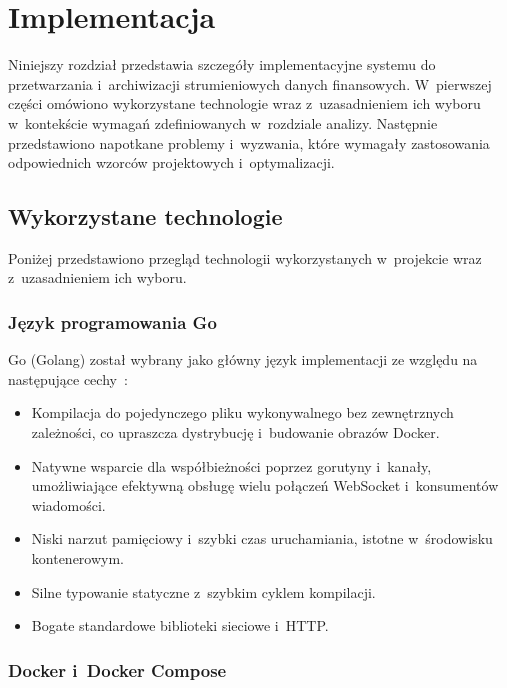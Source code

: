 \chapter{Implementacja}
\label{ch:implementacja}

Niniejszy rozdział przedstawia szczegóły implementacyjne systemu do przetwarzania i~archiwizacji strumieniowych danych
finansowych.
W~pierwszej części omówiono wykorzystane technologie wraz z~uzasadnieniem ich wyboru w~kontekście wymagań
zdefiniowanych w~rozdziale analizy.
Następnie przedstawiono napotkane problemy i~wyzwania, które wymagały zastosowania odpowiednich wzorców projektowych
i~optymalizacji.


\section{Wykorzystane technologie}
\label{sec:technologie}

Poniżej przedstawiono przegląd technologii wykorzystanych w~projekcie wraz z~uzasadnieniem ich wyboru.

\subsection{Język programowania Go}
\label{subsec:golang}

Go (Golang) został wybrany jako główny język implementacji ze względu na następujące cechy~\cite{go_at_google}:
\begin{itemize}
    \item Kompilacja do pojedynczego pliku wykonywalnego bez zewnętrznych zależności, co upraszcza dystrybucję
    i~budowanie obrazów Docker.
    \item Natywne wsparcie dla współbieżności poprzez gorutyny i~kanały, umożliwiające efektywną obsługę wielu
    połączeń WebSocket i~konsumentów wiadomości.
    \item Niski narzut pamięciowy i~szybki czas uruchamiania, istotne w~środowisku kontenerowym.
    \item Silne typowanie statyczne z~szybkim cyklem kompilacji.
    \item Bogate standardowe biblioteki sieciowe i~HTTP\@.
\end{itemize}

\subsection[Docker i Docker Compose]{Docker i~Docker Compose}
\label{subsec:tech_docker}

